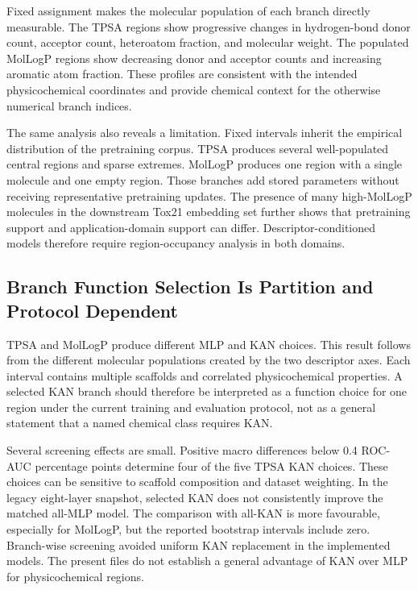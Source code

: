 \documentclass[journal=jcisd8,manuscript=article]{achemso}
\begin{document}
Fixed assignment makes the molecular population of each branch directly measurable. The TPSA regions show progressive changes in hydrogen-bond donor count, acceptor count, heteroatom fraction, and molecular weight. The populated MolLogP regions show decreasing donor and acceptor counts and increasing aromatic atom fraction. These profiles are consistent with the intended physicochemical coordinates and provide chemical context for the otherwise numerical branch indices.

The same analysis also reveals a limitation. Fixed intervals inherit the empirical distribution of the pretraining corpus. TPSA produces several well-populated central regions and sparse extremes. MolLogP produces one region with a single molecule and one empty region. Those branches add stored parameters without receiving representative pretraining updates. The presence of many high-MolLogP molecules in the downstream Tox21 embedding set further shows that pretraining support and application-domain support can differ. Descriptor-conditioned models therefore require region-occupancy analysis in both domains.

\subsection{Branch Function Selection Is Partition and Protocol Dependent}

TPSA and MolLogP produce different MLP and KAN choices. This result follows from the different molecular populations created by the two descriptor axes. Each interval contains multiple scaffolds and correlated physicochemical properties. A selected KAN branch should therefore be interpreted as a function choice for one region under the current training and evaluation protocol, not as a general statement that a named chemical class requires KAN.

Several screening effects are small. Positive macro differences below 0.4 ROC-AUC percentage points determine four of the five TPSA KAN choices. These choices can be sensitive to scaffold composition and dataset weighting. In the legacy eight-layer snapshot, selected KAN does not consistently improve the matched all-MLP model. The comparison with all-KAN is more favourable, especially for MolLogP, but the reported bootstrap intervals include zero. Branch-wise screening avoided uniform KAN replacement in the implemented models. The present files do not establish a general advantage of KAN over MLP for physicochemical regions.
\end{document}
